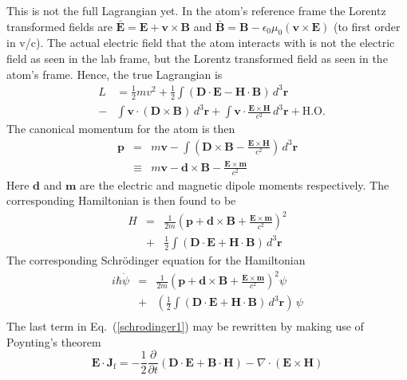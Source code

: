 This is not the full Lagrangian yet. In the atom's reference frame the Lorentz transformed fields are $\bar{\mathbf{E}}=\mathbf{E}+\mathbf{v}\times\mathbf{B}$ and $\bar{\mathbf{B}}=\mathbf{B}-\epsilon_0\mu_0\left(\mathbf{v}\times\mathbf{E}\right)$ (to first order in v/c). The actual electric field that the atom interacts with is not the electric field as seen in the lab frame, but the Lorentz transformed field as seen in the atom's frame.  Hence, the true Lagrangian is
\begin{eqnarray}
&L&=\frac{1}{2}mv^2 + \frac{1}{2}\int\left(\mathbf{D}\cdot\mathbf{E}-\mathbf{H}\cdot\mathbf{B}\right)\,d^3\mathbf{r} \nonumber \\
&-& \int\mathbf{v}\cdot\left(\mathbf{D}\times\mathbf{B}\right)\,d^3\mathbf{r}
+ \int\mathbf{v}\cdot\frac{\mathbf{E}\times\mathbf{H}}{c^2}\,d^3\mathbf{r} + \mathrm{H.O.}
\label{lagrangian2}
\end{eqnarray}
The canonical momentum for the atom is then
\begin{eqnarray}
\mathbf{p}&=&m\mathbf{v}- \int\left(\mathbf{D}\times\mathbf{B}-\frac{\mathbf{E}\times\mathbf{H}}{c^2}\right)\,d^3\mathbf{r} \nonumber \\
&\equiv & m\mathbf{v}-\mathbf{d}\times\mathbf{B}-\frac{\mathbf{E}\times\mathbf{m}}{c^2}
\label{canonical}
\end{eqnarray}
Here $\mathbf{d}$ and  $\mathbf{m}$ are the electric and magnetic dipole moments respectively.  The corresponding Hamiltonian is then found to be
\begin{eqnarray}
H&=&\frac{1}{2m}\left(\mathbf{p}+ \mathbf{d}\times\mathbf{B}+\frac{\mathbf{E}\times\mathbf{m}}{c^2}\right)^2\nonumber \\
&+&\frac{1}{2}\int\left(\mathbf{D}\cdot\mathbf{E}+\mathbf{H}\cdot\mathbf{B}\right)\,d^3\mathbf{r}
\label{hamilton1}
\end{eqnarray}
The corresponding Schr\"{o}dinger equation for the Hamiltonian
\begin{eqnarray}
i\hbar\dot{\psi}&=&\frac{1}{2m}\left(\mathbf{p}+ \mathbf{d}\times\mathbf{B}+\frac{\mathbf{E}\times\mathbf{m}}{c^2}\right)^2\psi\nonumber \\
&+&\left(\frac{1}{2}\int\left(\mathbf{D}\cdot\mathbf{E}+\mathbf{H}\cdot\mathbf{B}\right)\,d^3\mathbf{r}\right)\,\psi \nonumber\\
\label{schrodinger1}
\end{eqnarray}
The last term in Eq.\ (\ref{schrodinger1}) may be rewritten by making use of Poynting's theorem  \cite{griffiths}
\begin{equation}
\mathbf{E}\cdot\mathbf{J}_{\mathrm{f}}=-\frac{1}{2}\frac{\partial}{\partial t}\left(\mathbf{D}\cdot\mathbf{E}+\mathbf{B}\cdot\mathbf{H}\right)-\nabla\cdot\left(\mathbf{E}\times\mathbf{H}\right)
\label{poynting1}
\end{equation}

